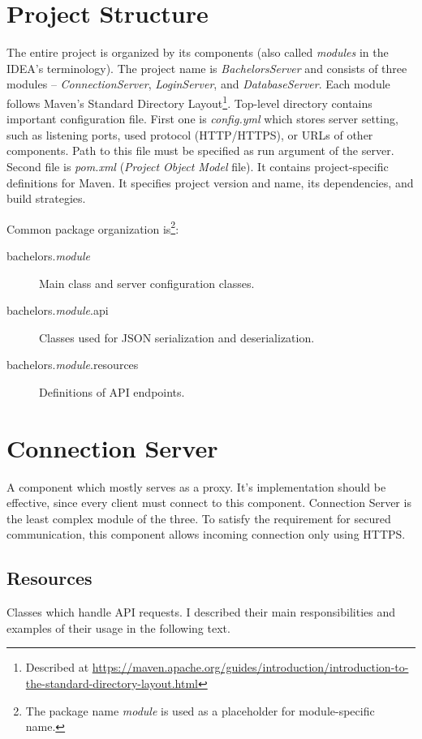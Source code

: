 \section{Project Structure}
The entire project is organized by its components (also called \textit{modules} in the IDEA's terminology). The project name is \textit{BachelorsServer} and consists of three modules -- \textit{ConnectionServer}, \textit{LoginServer}, and \textit{DatabaseServer}. Each module follows Maven's Standard Directory Layout\footnote{Described at \url{https://maven.apache.org/guides/introduction/introduction-to-the-standard-directory-layout.html}}. Top-level directory contains important configuration file. First one is \textit{config.yml} which stores server setting, such as listening ports, used protocol (HTTP/HTTPS), or URLs of other components. Path to this file must be specified as run argument of the server. Second file is \textit{pom.xml} (\textit{Project Object Model} file). It contains project-specific definitions for Maven. It specifies project version and name, its dependencies, and build strategies. 

Common package organization is\footnote{The package name \textit{module} is used as a placeholder for module-specific name.}:
\begin{description}
	\item[bachelors.\textit{module}] Main class and server configuration classes.
	\item[bachelors.\textit{module}.api] Classes used for JSON serialization and deserialization.
	\item[bachelors.\textit{module}.resources] Definitions of API endpoints.
\end{description}

\section{Connection Server}
A component which mostly serves as a proxy. It's implementation should be effective, since every client must connect to this component. Connection Server is the least complex module of the three. To satisfy the requirement for secured communication, this component allows incoming connection only using HTTPS.  

\subsection{Resources}
Classes which handle API requests. I described their main responsibilities and examples of their usage in the following text.

